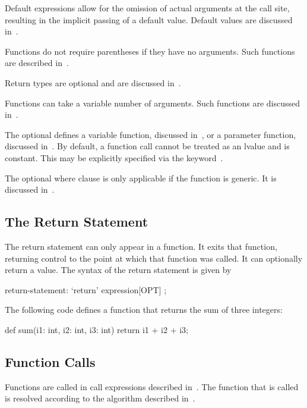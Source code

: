 Default expressions allow for the omission of actual arguments at the
call site, resulting in the implicit passing of a default value.
Default values are discussed in~.

Functions do not require parentheses if they have no arguments.  Such
functions are described in~.

Return types are optional and are discussed in~.

Functions can take a variable number of arguments.  Such functions are
discussed in~.

The optional  defines a variable function,
discussed in~, or a parameter function,
discussed in~.  By default, a function call
cannot be treated as an lvalue and is constant.  This may be
explicitly specified via the keyword~.

The optional where clause is only applicable if the function is
generic.  It is discussed in~.

\subsection{The Return Statement}
\label{The_Return_Statement}

The return statement can only appear in a function.  It exits that
function, returning control to the point at which that function was
called.  It can optionally return a value.  The syntax of the return
statement is given by
\begin{syntax}
return-statement:
  `return' expression[OPT] ;
\end{syntax}

\begin{example}
The following code defines a function that returns the sum of three
integers:
\begin{chapel}
def sum(i1: int, i2: int, i3: int)
  return i1 + i2 + i3;
\end{chapel}
\end{example}

\subsection{Function Calls}
\label{Function_Calls}

Functions are called in call expressions described
in~.  The function that is called is resolved
according to the algorithm described in~.

